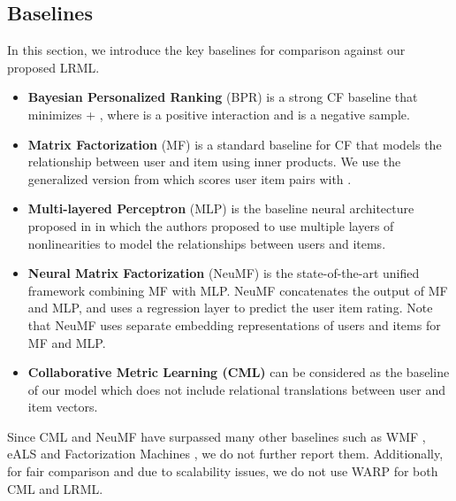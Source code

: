 \documentclass[sigconf]{acmart}
\begin{document}
\subsection{Baselines}
In this section, we introduce the key baselines for comparison against our proposed \textsc{LRML}.
\begin{itemize}

\item \textbf{Bayesian Personalized Ranking} (BPR) \cite{DBLP:conf/uai/RendleFGS09} is a strong CF baseline that minimizes  + , where  is a positive interaction and  is a negative sample.

\item \textbf{Matrix Factorization} (MF) is a standard baseline for CF that models the relationship between user and item using inner products. We use the generalized version from \cite{He:2017:NCF:3038912.3052569} which scores user item pairs with . 
\item \textbf{Multi-layered Perceptron} (MLP) is the baseline neural architecture proposed in \cite{He:2017:NCF:3038912.3052569} in which the authors proposed to use multiple layers of nonlinearities to model the relationships between users and items. 
\item \textbf{Neural Matrix Factorization} (NeuMF) \cite{He:2017:NCF:3038912.3052569} is the state-of-the-art unified framework combining MF with MLP. NeuMF concatenates the output of MF and MLP, and uses a regression layer to predict the user item rating. Note that NeuMF uses separate embedding representations of users and items for MF and MLP. 
\item \textbf{Collaborative Metric Learning (CML)} \cite{DBLP:conf/www/HsiehYCLBE17} can be considered as the baseline of our model which does not include relational translations between user and item vectors. 
\end{itemize}
Since CML and NeuMF have surpassed many other baselines such as WMF \cite{DBLP:conf/icdm/HuKV08}, eALS \cite{DBLP:conf/sigir/HeZKC16} and Factorization Machines \cite{DBLP:conf/icdm/Rendle10}, we do not further report them.  Additionally, for fair comparison and due to scalability issues, we do not use WARP \cite{DBLP:journals/ml/WestonBU10} for both CML and \textsc{LRML}.
\end{document}
